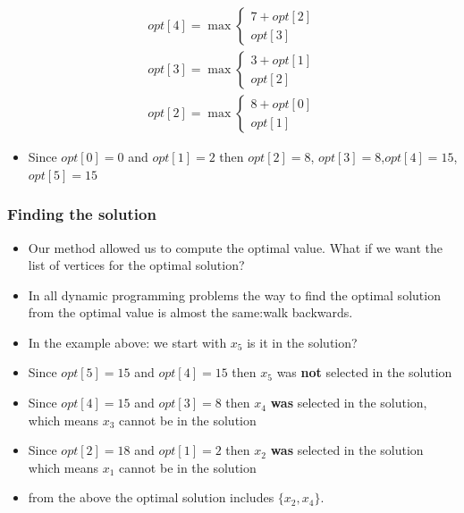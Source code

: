 \documentclass{beamer}
\begin{document}
\begin{frame}
    \begin{align*}
    opt[4]=\max\left\{\begin{aligned}7+opt[2]\\opt[3] \end{aligned}  \right. \\
    opt[3]=\max\left\{\begin{aligned}3+opt[1]\\opt[2] \end{aligned}  \right. \\
    opt[2]=\max\left\{\begin{aligned}8+opt[0]\\opt[1] \end{aligned}  \right. 
  \end{align*}
  \begin{itemize}
  \item Since $opt[0]=0$ and $opt[1]=2$ then $opt[2]=8$, $opt[3]=8$,$opt[4]=15$,$opt[5]=15$
  \end{itemize}
\end{frame}

\begin{frame}
  \frametitle{Finding the solution}
  \begin{itemize}
  \item Our method allowed us to compute the optimal value. What if we want the list of vertices for the optimal solution?
  \item In all dynamic programming problems the way to find the optimal solution from the optimal value is almost the same:walk backwards.
  \item In the example above: we start with $x_5$ is it in the solution?
 \item Since $opt[5]=15$ and $opt[4]=15$ then $x_5$ was \textbf{not} selected in the solution
 \item Since $opt[4]=15$ and $opt[3]=8$ then $x_4$ \textbf{was}  selected in the solution, which means $x_3$ cannot be in the solution
 \item Since $opt[2]=18$ and $opt[1]=2$ then $x_2$ \textbf{ was} selected in the solution which means $x_1$ cannot be in the solution
\item from the above the optimal solution includes $\{x_2,x_4\}$.

  \end{itemize}
\end{frame}
\end{document}
